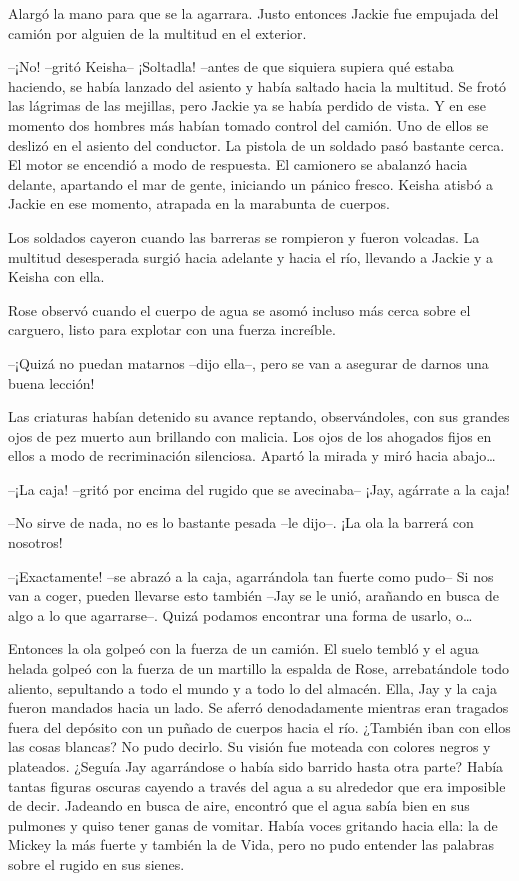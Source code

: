 {Alargó la mano para que se la agarrara. Justo entonces Jackie fue
empujada del camión por alguien de la multitud en el exterior.}

{--¡No! --gritó Keisha-- ¡Soltadla! --antes de que siquiera supiera qué
 estaba haciendo, se había lanzado del asiento y había saltado hacia la
 multitud. Se frotó las lágrimas de las mejillas, pero Jackie ya se había
 perdido de vista. Y en ese momento dos hombres más habían tomado control
 del camión. Uno de ellos se deslizó en el asiento del conductor. La
 pistola de un soldado pasó bastante cerca. El motor se encendió a modo
 de respuesta. El camionero se abalanzó hacia delante, apartando el mar
 de gente, iniciando un pánico fresco. Keisha atisbó a Jackie en ese
momento, atrapada en la marabunta de cuerpos.}

{Los soldados cayeron cuando las barreras se rompieron y fueron
 volcadas. La multitud desesperada surgió hacia adelante y hacia el río,
llevando a Jackie y a Keisha con ella.}

\mbox{}

{Rose observó cuando el cuerpo de agua se asomó incluso más cerca sobre
el carguero, listo para explotar con una fuerza increíble.}

{--¡Quizá no puedan matarnos --dijo ella--, pero se van a asegurar de
darnos una buena lección!}

{Las criaturas habían detenido su avance reptando, observándoles, con
 sus grandes ojos de pez muerto aun brillando con malicia. Los ojos de
 los ahogados fijos en ellos a modo de recriminación silenciosa. Apartó
 la mirada y miró hacia abajo\ldots{}}

{--¡La caja! --gritó por encima del rugido que se avecinaba-- ¡Jay,
agárrate a la caja!}

{--No sirve de nada, no es lo bastante pesada --le dijo--. ¡La ola la
barrerá con nosotros!}

{--¡Exactamente! --se abrazó a la caja, agarrándola tan fuerte como
 pudo-- Si nos van a coger, pueden llevarse esto también --Jay se le
 unió, arañando en busca de algo a lo que agarrarse--. Quizá podamos
 encontrar una forma de usarlo, o\ldots{}}

{Entonces la ola golpeó con la fuerza de un camión. El suelo tembló y el
 agua helada golpeó con la fuerza de un martillo la espalda de Rose,
 arrebatándole todo aliento, sepultando a todo el mundo y a todo lo del
 almacén. Ella, Jay y la caja fueron mandados hacia un lado. Se aferró
 denodadamente mientras eran tragados fuera del depósito con un puñado de
 cuerpos hacia el río. ¿También iban con ellos las cosas blancas? No pudo
 decirlo. Su visión fue moteada con colores negros y plateados. ¿Seguía
 Jay agarrándose o había sido barrido hasta otra parte? Había tantas
 figuras oscuras cayendo a través del agua a su alrededor que era
 imposible de decir. Jadeando en busca de aire, encontró que el agua
 sabía bien en sus pulmones y quiso tener ganas de vomitar. Había voces
 gritando hacia ella: la de Mickey la más fuerte y también la de Vida,
pero no pudo entender las palabras sobre el rugido en sus sienes.}

